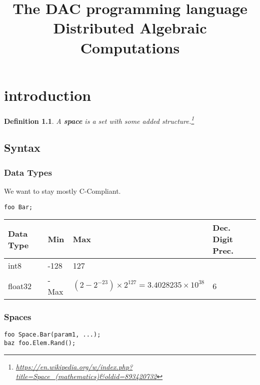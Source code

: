 \documentclass{amsbook}
\title{
  The DAC programming language \\
  \large Distributed Algebraic Computations}
\newtheorem{definition}{Definition}
\begin{document}
\begin{titlepage}
  \maketitle
  \thispagestyle{empty}
\end{titlepage}

\tableofcontents
\thispagestyle{empty}
\newpage

\chapter{introduction}


\begin{definition}
  A \textbf{space} is a set with some added structure.\footnote{\url{https://en.wikipedia.org/w/index.php?title=Space_(mathematics)&oldid=893420732}}
\end{definition}

\section{Syntax}

\subsection{Data Types}
We want to stay mostly C-Compliant.

\begin{verbatim}
foo Bar;
\end{verbatim}

\begin{tabular}{l|l|l|l}
  \textbf{Data Type} & \textbf{Min} & \textbf{Max} & \textbf{Dec. Digit Prec.}\\
  \hline
  int8 &  -128 & 127 & \\
  float32 & -Max & $(2-2^{-23})\times 2^{127}=3.4028235\times 10^{38}$ & 6
\end{tabular}

\subsection{Spaces}

\begin{verbatim}
foo Space.Bar(param1, ...);
baz foo.Elem.Rand();
\end{verbatim}
\end{document}
